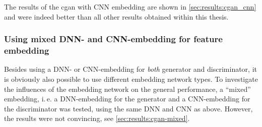 The results of the \acrshort{cgan} with CNN embedding are shown in \cref{sec:results:cgan_cnn} 
and were indeed better than all other results obtained within this thesis.

\subsubsection{Using mixed DNN- and CNN-embedding for feature embedding} \label{sec:improve:mixed-embedding}
Besides using a DNN- or CNN-embedding for \emph{both} generator and discriminator, it is obviously also possible
to use different embedding network types.
To investigate the influences of the embedding network on the general performance,
a ``mixed'' embedding, i.\,e. a DNN-embedding for the generator and a CNN-embedding for the discriminator was tested,
using the same DNN and CNN as above.
However, the results were not convincing, see \cref{sec:results:cgan-mixed}.










